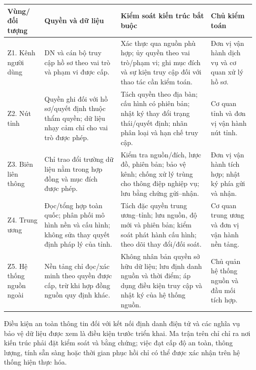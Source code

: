 \documentclass[a4paper,11pt]{article}
\begin{document}
\small
\renewcommand{\arraystretch}{1.02}
\setlength{\tabcolsep}{2pt}
\begin{center}
\begin{tabularx}{0.98\textwidth}{@{}p{2.0cm}p{3.0cm}X p{2.2cm}@{}}
\toprule
\textbf{Vùng/đối tượng} & \textbf{Quyền và dữ liệu} & \textbf{Kiểm soát kiến trúc bắt buộc} & \textbf{Chủ kiểm toán} \\
\midrule
Z1. Kênh người dùng & DN và cán bộ truy cập hồ sơ theo vai trò và phạm vi được cấp. & Xác thực qua nguồn phù hợp; ủy quyền theo vai trò/phạm vi; ghi mục đích và sự kiện truy cập đối với thao tác cần kiểm toán. & Đơn vị vận hành dịch vụ và cơ quan xử lý hồ sơ. \\
\addlinespace
Z2. Nút tỉnh & Quyền ghi đối với hồ sơ/quyết định thuộc thẩm quyền; dữ liệu nhạy cảm chỉ cho vai trò được phép. & Tách quyền theo địa bàn; cấu hình có phiên bản; nhật ký thay đổi trạng thái/quyết định; nhãn phân loại và hạn chế truy cập. & Cơ quan tỉnh và đơn vị vận hành nút tỉnh. \\
\addlinespace
Z3. Biên liên thông & Chỉ trao đổi trường dữ liệu nằm trong hợp đồng và mục đích được phép. & Kiểm tra nguồn/đích, lược đồ, phiên bản; bảo vệ kênh; chống xử lý trùng cho thông điệp nghiệp vụ; lưu bằng chứng gửi--nhận. & Đơn vị vận hành tích hợp; nhật ký phía gửi và nhận. \\
\addlinespace
Z4. Trung ương & Đọc/tổng hợp toàn quốc; phân phối mô hình nền và cấu hình; không sửa thay quyết định pháp lý của tỉnh. & Tách đặc quyền trung ương--tỉnh; lưu nguồn, độ mới và phiên bản; kiểm soát phát hành cấu hình; theo dõi thay đổi/đối soát. & Cơ quan trung ương và đơn vị vận hành nền tảng. \\
\addlinespace
Z5. Hệ thống nguồn ngoài & Nền tảng chỉ đọc/xác minh theo quyền được cấp, trừ khi hợp đồng nguồn quy định khác. & Không nhân bản quyền sở hữu dữ liệu; lưu định danh nguồn và thời điểm; áp dụng điều kiện truy cập và nhật ký của hệ thống nguồn. & Chủ quản hệ thống nguồn và đầu mối tích hợp. \\
\bottomrule
\end{tabularx}
\end{center}
\normalsize

Điều kiện an toàn thông tin đối với kết nối định danh điện tử và các nghĩa vụ bảo vệ dữ liệu được xem là điều kiện trước triển khai. Ma trận trên chỉ chỉ ra nơi kiến trúc phải đặt kiểm soát và bằng chứng; việc đạt cấp độ an toàn, thông lượng, tính sẵn sàng hoặc thời gian phục hồi chỉ có thể được xác nhận trên hệ thống hiện thực hóa.
\end{document}
